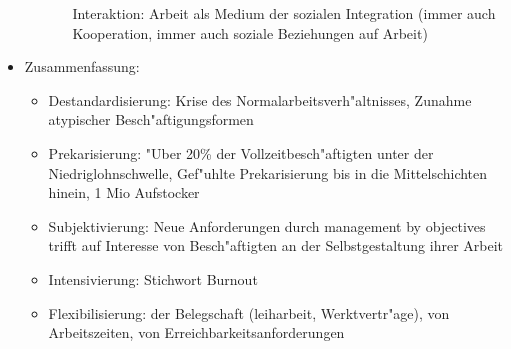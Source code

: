 \begin{itemize}
\begin{itemize}
\begin{itemize}
						Interaktion: Arbeit als Medium der sozialen Integration (immer auch Kooperation, immer auch soziale Beziehungen auf Arbeit)
				\end{itemize}
		\end{itemize}
	\item
		Zusammenfassung:
		\begin{itemize}
			\item
				Destandardisierung: Krise des Normalarbeitsverh"altnisses, Zunahme atypischer Besch"aftigungsformen
			\item
				Prekarisierung: "Uber 20\% der Vollzeitbesch"aftigten unter der Niedriglohnschwelle,
				Gef"uhlte Prekarisierung bis in die Mittelschichten hinein, 1 Mio Aufstocker
			\item
				Subjektivierung: Neue Anforderungen durch management by objectives trifft auf Interesse von Besch"aftigten an der Selbstgestaltung ihrer Arbeit
			\item
				Intensivierung: Stichwort Burnout
			\item
				Flexibilisierung: der Belegschaft (leiharbeit, Werktvertr"age), von Arbeitszeiten, von Erreichbarkeitsanforderungen
		\end{itemize}
\end{itemize}
